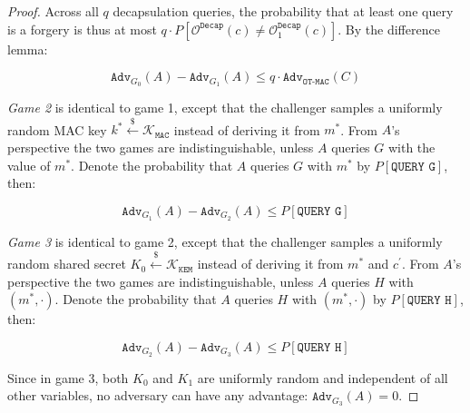 \documentclass[journal=tches,submission]{iacrtrans}
\newcommand{\kem}{\texttt{KEM}}
\newcommand{\decap}{\texttt{Decap}}
\newcommand{\mac}{\texttt{MAC}}
\newcommand{\leftsample}{\stackrel{\$}{\leftarrow}}
\newcommand{\adv}{\texttt{Adv}}
\begin{document}
\begin{proof}
    Across all $q$ decapsulation queries, the probability that at least one query is a forgery is thus at most $q \cdot P\left[\mathcal{O}^\decap(c) \neq \mathcal{O}^\decap_1(c)\right]$. By the difference lemma:

    \begin{equation*}
        \adv_{G_0}(A) - \adv_{G_1}(A) \leq q\cdot  \adv_\texttt{OT-MAC}(C)
    \end{equation*}

    \emph{Game 2} is identical to game 1, except that the challenger samples a uniformly random MAC key $k^\ast \leftsample \mathcal{K}_\mac$ instead of deriving it from $m^\ast$. From $A$'s perspective the two games are indistinguishable, unless $A$ queries $G$ with the value of $m^\ast$. Denote the probability that $A$ queries $G$ with $m^\ast$ by $P[\texttt{QUERY G}]$, then:

    \begin{equation*}
        \adv_{G_1}(A) - \adv_{G_2}(A) \leq P\left[\texttt{QUERY G}\right]
    \end{equation*}

    \emph{Game 3} is identical to game 2, except that the challenger samples a uniformly random shared secret $K_0 \leftsample \mathcal{K}_\kem$ instead of deriving it from $m^\ast$ and $c^\prime$. From $A$'s perspective the two games are indistinguishable, unless $A$ queries $H$ with $(m^\ast, \cdot)$. Denote the probability that $A$ queries $H$ with $(m^\ast, \cdot)$ by $P[\texttt{QUERY H}]$, then:

    \begin{equation*}
        \adv_{G_2}(A) - \adv_{G_3}(A) \leq P\left[\texttt{QUERY H}\right]
    \end{equation*}

    Since in game 3, both $K_0$ and $K_1$ are uniformly random and independent of all other variables, no adversary can have any advantage: $\adv_{G_3}(A) = 0$.


\end{proof}
\end{document}
